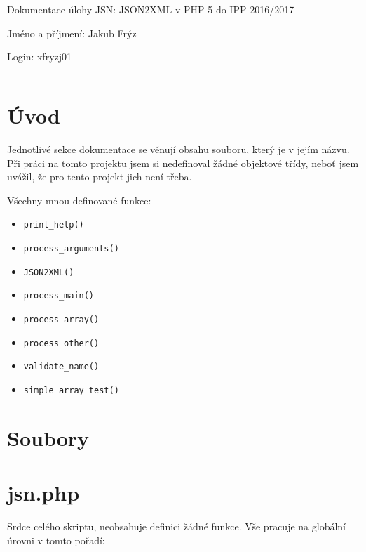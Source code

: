 \documentclass[a4paper, 10pt]{article}
\begin{document}
\begin{flushleft}

Dokumentace úlohy JSN: JSON2XML v PHP 5 do IPP 2016/2017

Jméno a příjmení: Jakub Frýz

Login: xfryzj01

\rule{\textwidth}{0.4pt}

\end{flushleft}

\section*{Úvod}

Jednotlivé sekce dokumentace se věnují obsahu souboru, který je v jejím názvu. Při práci na tomto projektu jsem si nedefinoval žádné objektové třídy, neboť jsem uvážil, že pro tento projekt jich není třeba.

Všechny mnou definované funkce:

\begin{multicols}{2}
\begin{itemize}
	\setlength\itemsep{0pt}
	\item\verb|print_help()|
	\item\verb|process_arguments()|
	\item\verb|JSON2XML()|
	\item\verb|process_main()|
	\item\verb|process_array()|
	\item\verb|process_other()|
	\item\verb|validate_name()|
	\item\verb|simple_array_test()|
\end{itemize}
\end{multicols}

\section*{Soubory}

\section{jsn.php}

Srdce celého skriptu, neobsahuje definici žádné funkce.
Vše pracuje na globální úrovni v tomto pořadí:
\end{document}
